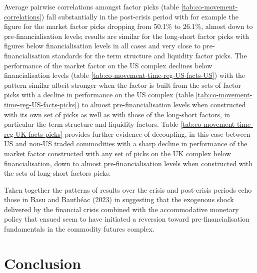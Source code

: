 \documentclass[]{elsarticle} %
\begin{document}
Average pairwise correlations amongst factor picks (table \ref{tab:co-movement-correlations}) fall substantially in the post-crisis period with for example the figure for the market factor picks dropping from 50.1\% to 26.1\%, almost down to pre-financialisation levels; results are similar for the long-short factor picks with figures below financialisation levels in all cases and very close to pre-financialisation standards for the term structure and liquidity factor picks. The performance of the market factor on the US complex declines below financialisation levels (table \ref{tab:co-movement-time-reg-US-facts-US}) with the pattern similar albeit stronger when the factor is built from the sets of factor picks with a decline in performance on the US complex (table \ref{tab:co-movement-time-reg-US-facts-picks}) to almost pre-financialisation levels when constructed with its own set of picks as well as with those of the long-short factors, in particular the term structure and liquidity factors. Table \ref{tab:co-movement-time-reg-UK-facts-picks} provides further evidence of decoupling, in this case between US and non-US traded commodities with a sharp decline in performance of the market factor constructed with any set of picks on the UK complex below financialisation, down to almost pre-financialisation levels when constructed with the sets of long-short factors picks.

\medskip\setlength{\parindent}{0pt}

Taken together the patterns of results over the crisis and post-crisis periods echo those in Basu and Bauthéac (2023) in suggesting that the exogenous shock delivered by the financial crisis combined with the accommodative monetary policy that ensued seem to have initiated a reversion toward pre-financialisation fundamentals in the commodity futures complex.

\newpage

\hypertarget{conclusion}{%
\section{Conclusion}\label{conclusion}}
\end{document}
